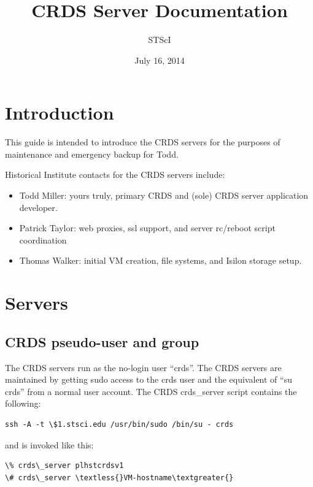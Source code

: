 \documentclass[letterpaper,10pt,english]{sphinxmanual}
\title{CRDS Server Documentation}
\date{July 16, 2014}
\author{STScI}
\begin{document}
\maketitle
\tableofcontents
{}\label{index::doc}



\chapter{Introduction}
\label{server_guide:introduction}\label{server_guide::doc}\label{server_guide:crds-server-guide}
This guide is intended to introduce the CRDS servers for the purposes of maintenance and emergency backup for Todd.

Historical Institute contacts for the CRDS servers include:
\begin{itemize}
\item {} 
Todd Miller:    yours truly,  primary CRDS and (sole) CRDS server application developer.

\item {} 
Patrick Taylor: web proxies, ssl support, and server rc/reboot script coordination

\item {} 
Thomas Walker:  initial VM creation, file systems, and Isilon storage setup.

\end{itemize}


\chapter{Servers}
\label{server_guide:servers}

\section{CRDS pseudo-user and group}
\label{server_guide:crds-pseudo-user-and-group}
The CRDS servers run as the no-login user ``crds''.  The CRDS servers are maintained by getting sudo
access to the crds user and the equivalent of ``su crds'' from a normal user account.   The CRDS
crds\_server script contains the following:

\begin{Verbatim}[commandchars=\\\{\}]
ssh -A -t \$1.stsci.edu /usr/bin/sudo /bin/su - crds
\end{Verbatim}

and is invoked like this:

\begin{Verbatim}[commandchars=\\\{\}]
\% crds\_server plhstcrdsv1
\# crds\_server \textless{}VM-hostname\textgreater{}
\end{Verbatim}
\end{document}

